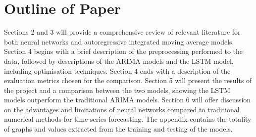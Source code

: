 \section{Outline of Paper}
Sections 2 and 3 will provide a comprehensive review of relevant literature for both neural networks and autoregressive integrated moving average models. Section 4 begins with a brief description of the preprocessing performed to the data, followed by descriptions of the ARIMA models and the LSTM model, including optimisation techniques. Section 4 ends with a description of the evaluation metrics chosen for the comparison. Section 5 will present the results of the project and a comparison between the two models, showing the LSTM models outperform the traditional ARIMA models. Section 6 will offer discussion on the advantages and limitations of neural networks compared to traditional numerical methods for time-series forecasting. The appendix contains the totality of graphs and values extracted from the training and testing of the models.